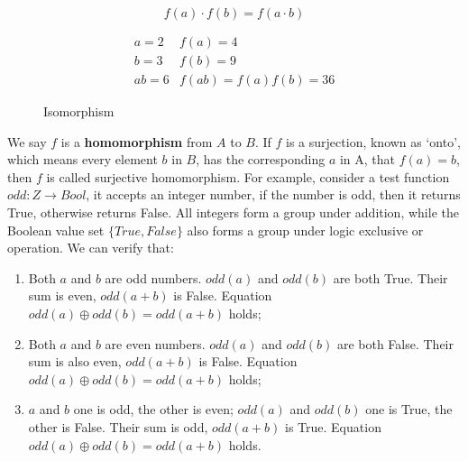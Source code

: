 \documentclass{article}
\begin{document}
\[
f(a) \cdot f(b) = f(a \cdot b)
\]

\begin{figure}[htbp]
\centering
{}
\[
\begin{array}{rl}
a = 2 & f(a) = 4 \\
b = 3 & f(b) = 9 \\
ab = 6 & f(ab) = f(a)f(b) = 36
\end{array}
\]
\caption{Isomorphism}
\label{fig:isomorphism}
\end{figure}

We say $f$ is a \textbf{homomorphism} from $A$ to $B$. If $f$ is a surjection, known as `onto', which means every element $b$ in $B$, has the corresponding $a$ in A, that $f(a) = b$, then $f$ is called surjective homomorphism. For example, consider a test function $odd: Z \to Bool$, it accepts an integer number, if the number is odd, then it returns True, otherwise returns False. All integers form a group under addition, while the Boolean value set $\{True, False\}$ also forms a group under logic exclusive or operation. We can verify that:

\begin{enumerate}
\item Both $a$ and $b$ are odd numbers. $odd(a)$ and $odd(b)$ are both True. Their sum is even, $odd(a+b)$ is False. Equation $odd(a) \oplus odd(b) = odd(a+b)$ holds;
\item Both $a$ and $b$ are even numbers. $odd(a)$ and $odd(b)$ are both False. Their sum is also even, $odd(a+b)$ is False. Equation $odd(a) \oplus odd(b) = odd(a+b)$ holds;
\item $a$ and $b$ one is odd, the other is even; $odd(a)$ and $odd(b)$ one is True, the other is False. Their sum is odd, $odd(a+b)$ is True. Equation $odd(a) \oplus odd(b) = odd(a+b)$ holds.
\end{enumerate}
\end{document}
